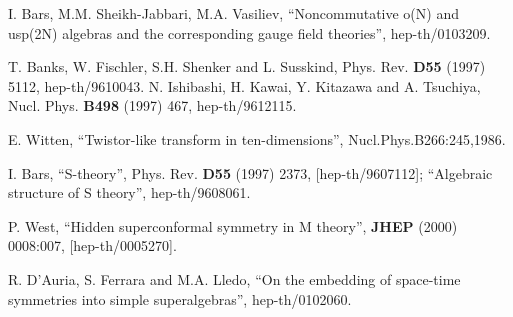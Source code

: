 \documentclass[a4paper,12pt]{article}
\begin{document}
\begin{thebibliography}{99}
  I. Bars, M.M. Sheikh-Jabbari, M.A. Vasiliev,
``Noncommutative o\myHighlight{$_{\star }$}\coordHE{}(N) and usp\myHighlight{$_{\star }$}\coordHE{}(2N) algebras and the
corresponding gauge field theories'', hep-th/0103209.

  T. Banks, W. Fischler, S.H. Shenker and L. Susskind, Phys.
Rev. \textbf{D55} (1997) 5112, hep-th/9610043.
N. Ishibashi, H. Kawai, Y. Kitazawa and A. Tsuchiya, Nucl. Phys. \textbf{B498%
} (1997) 467, hep-th/9612115.

  E. Witten, ``Twistor-like transform in ten-dimensions'',
Nucl.Phys.B266:245,1986.

  I. Bars, ``S-theory'', Phys. Rev. \textbf{D55} (1997)
2373, [hep-th/9607112]; ``Algebraic structure of S theory'', hep-th/9608061.

  P. West, ``Hidden superconformal symmetry in M theory'',
\textbf{JHEP} (2000) 0008:007, [hep-th/0005270].

  R. D'Auria, S. Ferrara and M.A. Lledo, ``On the embedding
of space-time symmetries into simple superalgebras'', hep-th/0102060.
\end{thebibliography}
\end{document}
